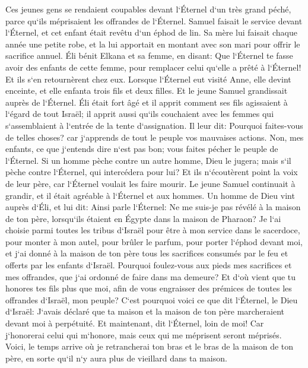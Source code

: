 \verse Ces jeunes gens se rendaient coupables devant l`Éternel d`un très grand péché, parce qu`ils méprisaient les offrandes de l`Éternel. 
\verse Samuel faisait le service devant l`Éternel, et cet enfant était revêtu d`un éphod de lin. 
\verse Sa mère lui faisait chaque année une petite robe, et la lui apportait en montant avec son mari pour offrir le sacrifice annuel. 
\verse Éli bénit Elkana et sa femme, en disant: Que l`Éternel te fasse avoir des enfants de cette femme, pour remplacer celui qu`elle a prêté à l`Éternel! Et ils s`en retournèrent chez eux. 
\verse Lorsque l`Éternel eut visité Anne, elle devint enceinte, et elle enfanta trois fils et deux filles. Et le jeune Samuel grandissait auprès de l`Éternel. 
\verse Éli était fort âgé et il apprit comment ses fils agissaient à l`égard de tout Israël; il apprit aussi qu`ils couchaient avec les femmes qui s`assemblaient à l`entrée de la tente d`assignation. 
\verse Il leur dit: Pourquoi faites-vous de telles choses? car j`apprends de tout le peuple vos mauvaises actions. 
\verse Non, mes enfants, ce que j`entends dire n`est pas bon; vous faites pécher le peuple de l`Éternel. 
\verse Si un homme pèche contre un autre homme, Dieu le jugera; mais s`il pèche contre l`Éternel, qui intercédera pour lui? Et ils n`écoutèrent point la voix de leur père, car l`Éternel voulait les faire mourir. 
\verse Le jeune Samuel continuait à grandir, et il était agréable à l`Éternel et aux hommes. 
\verse Un homme de Dieu vint auprès d`Éli, et lui dit: Ainsi parle l`Éternel: Ne me suis-je pas révélé à la maison de ton père, lorsqu`ils étaient en Égypte dans la maison de Pharaon? 
\verse Je l`ai choisie parmi toutes les tribus d`Israël pour être à mon service dans le sacerdoce, pour monter à mon autel, pour brûler le parfum, pour porter l`éphod devant moi, et j`ai donné à la maison de ton père tous les sacrifices consumés par le feu et offerts par les enfants d`Israël. 
\verse Pourquoi foulez-vous aux pieds mes sacrifices et mes offrandes, que j`ai ordonné de faire dans ma demeure? Et d`où vient que tu honores tes fils plus que moi, afin de vous engraisser des prémices de toutes les offrandes d`Israël, mon peuple? 
\verse C`est pourquoi voici ce que dit l`Éternel, le Dieu d`Israël: J`avais déclaré que ta maison et la maison de ton père marcheraient devant moi à perpétuité. Et maintenant, dit l`Éternel, loin de moi! Car j`honorerai celui qui m`honore, mais ceux qui me méprisent seront méprisés. 
\verse Voici, le temps arrive où je retrancherai ton bras et le bras de la maison de ton père, en sorte qu`il n`y aura plus de vieillard dans ta maison. 
